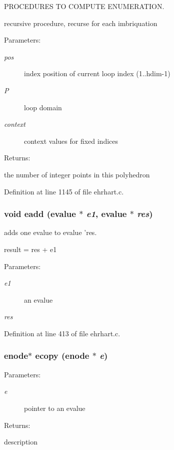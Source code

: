 PROCEDURES TO COMPUTE ENUMERATION.

recursive procedure, recurse for each imbriquation\begin{Desc}
\item[Parameters: ]\par
\begin{description}
\item[{\em 
pos}]index position of current loop index (1..hdim-1) \item[{\em 
P}]loop domain \item[{\em 
context}]context values for fixed indices  \end{description}
\end{Desc}
\begin{Desc}
\item[Returns: ]\par
the number of integer points in this polyhedron \end{Desc}


Definition at line 1145 of file ehrhart.c.
\subsubsection{\setlength{\rightskip}{0pt plus 5cm}void eadd (evalue $\ast$ {\em e1}, evalue $\ast$ {\em res})}\label{ehrhart_8c_a15}


adds one evalue to evalue 'res.

result = res + e1\begin{Desc}
\item[Parameters: ]\par
\begin{description}
\item[{\em 
e1}]an evalue  \item[{\em 
res}]\end{description}
\end{Desc}


Definition at line 413 of file ehrhart.c.
\subsubsection{\setlength{\rightskip}{0pt plus 5cm}enode$\ast$ ecopy (enode $\ast$ {\em e})}\label{ehrhart_8c_a9}


\begin{Desc}
\item[Parameters: ]\par
\begin{description}
\item[{\em 
e}]pointer to an evalue  \end{description}
\end{Desc}
\begin{Desc}
\item[Returns: ]\par
description \end{Desc}



